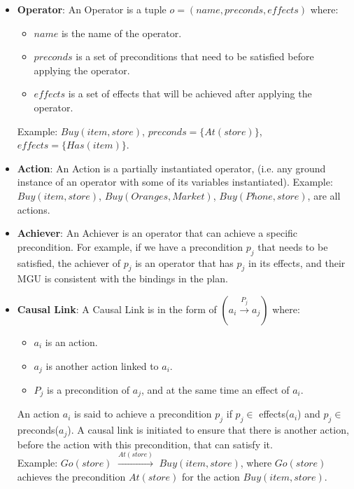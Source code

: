 \begin{itemize}
      \item \label{def:operator}
            \textbf{Operator}: An Operator is a tuple $o = (name, preconds, effects)$ where:
            \begin{itemize}
                  \item $name$ is the name of the operator.
                  \item $preconds$ is a set of preconditions that need to be satisfied before applying the operator.
                  \item $effects$ is a set of effects that will be achieved after applying the operator.
            \end{itemize}
            Example: $Buy(item,store)$, $preconds = \{At(store)\}$, $effects = \{Has(item)\}$.

      \item \label{def:action}
            \textbf{Action}: An Action  is a partially instantiated operator,
            (i.e. any ground instance of an operator with some of its variables instantiated).
            Example: $Buy(item,store)$, $Buy(Oranges,Market)$, $Buy(Phone,store)$, are all actions.

      \item \label{def:achiever}
            \textbf{Achiever}: An Achiever is an operator that can achieve a specific precondition. For example, if we have a precondition $p_j$ that needs to be satisfied, the achiever of $p_j$ is an operator that has $p_j$ in its effects, and their \ac{MGU} is consistent with the bindings in the plan.

      \item \label{def:causal_link}
            \textbf{Causal Link}: A Causal Link is in the form of $(a_i \xrightarrow{\text{$P_j$}} a_j)$ where:
            \begin{itemize}
                  \item $a_i$ is an action.
                  \item $a_j$ is another action linked to $a_i$.
                  \item $P_j$ is a precondition of $a_j$, and at the same time an effect of $a_i$.
            \end{itemize}
            An action $a_i$ is said to achieve a precondition $p_j$ if $p_j \in$ effects($a_i$) and $p_j \in$ preconds($a_j$).
            A causal link is initiated to ensure that there is another action, before the action with this precondition, that can satisfy it.
            \\ Example: $Go(store)$ $\xrightarrow{\text{$At(store)$}}$ $Buy(item,store)$, where $Go(store)$ achieves the precondition $At(store)$ for the action $Buy(item,store)$.


\end{itemize}
